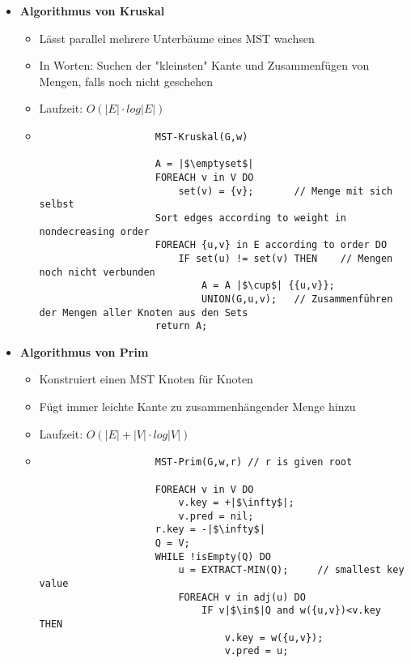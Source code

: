 \begin{itemize}
        \item \textbf{Algorithmus von Kruskal}
            \begin{itemize}
                \item Lässt parallel mehrere Unterbäume eines MST wachsen
                \item In Worten: Suchen der \string"kleinsten\string" Kante und Zusammenfügen von Mengen, falls noch nicht geschehen
                \item Laufzeit: $O(|E| \cdot log|E|)$
                \item[]
                    \begin{verbatim}
                    MST-Kruskal(G,w)
                    
                    A = |$\emptyset$|
                    FOREACH v in V DO
                        set(v) = {v};       // Menge mit sich selbst
                    Sort edges according to weight in nondecreasing order
                    FOREACH {u,v} in E according to order DO
                        IF set(u) != set(v) THEN    // Mengen noch nicht verbunden
                            A = A |$\cup$| {{u,v}}; 
                            UNION(G,u,v);   // Zusammenführen der Mengen aller Knoten aus den Sets
                    return A;
                    \end{verbatim}
            \end{itemize}

        \item \textbf{Algorithmus von Prim}
            \begin{itemize}
                \item Konstruiert einen MST Knoten für Knoten
                \item Fügt immer leichte Kante zu zusammenhängender Menge hinzu
                \item Laufzeit: $O(|E| + |V| \cdot log|V|)$
                \item[]
                    \begin{verbatim}
                    MST-Prim(G,w,r) // r is given root

                    FOREACH v in V DO 
                        v.key = +|$\infty$|;
                        v.pred = nil;
                    r.key = -|$\infty$|
                    Q = V;
                    WHILE !isEmpty(Q) DO
                        u = EXTRACT-MIN(Q);     // smallest key value
                        FOREACH v in adj(u) DO
                            IF v|$\in$|Q and w({u,v})<v.key THEN
                                v.key = w({u,v});
                                v.pred = u;
                    \end{verbatim}
            \end{itemize}
        
    \end{itemize}

